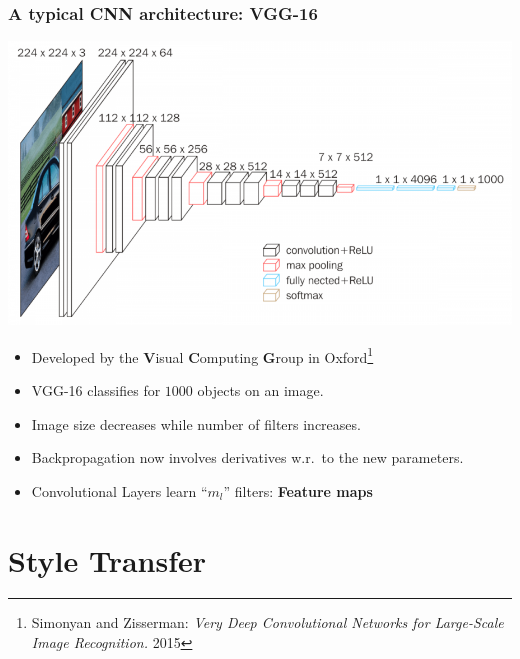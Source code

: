 \documentclass[10pt,hyperref={pdfpagelabels=false}]{beamer}
\begin{document}
\begin{frame}[allowframebreaks]
    \frametitle{A typical CNN architecture: VGG-16}
    \includegraphics[width=.9\textwidth]{figures/vgg16.png}
    \framebreak
    \begin{itemize}
        \item Developed by the {\bf V}isual {\bf C}omputing {\bf G}roup in Oxford\footnote{Simonyan and Zisserman: \emph{Very Deep Convolutional Networks for Large-Scale Image Recognition.} 2015}
        \item VGG-16 classifies for $1000$ objects on an image.
        \item Image size decreases while number of filters increases.
        \item Backpropagation now involves derivatives w.r.~to the new parameters.
        \item Convolutional Layers learn ``$m_l$'' filters: {\bf Feature maps}
        
    \end{itemize}
\end{frame}
\section{Style Transfer}
\end{document}
